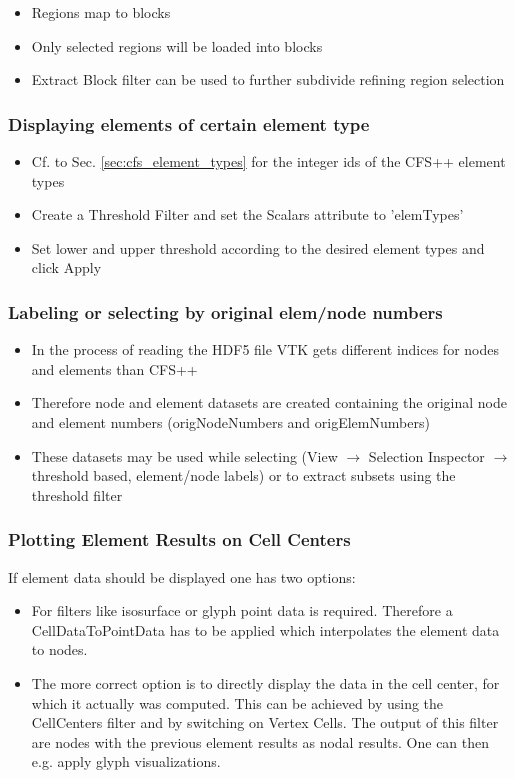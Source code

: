 \begin{itemize}
\item Regions map to blocks
\item Only selected regions will be loaded into blocks
\item Extract  Block filter can be  used to further  subdivide refining region
selection
\end{itemize}

\subsubsection{Displaying elements of certain element type}

\begin{itemize}
\item Cf. to Sec. \ref{sec:cfs_element_types} for the integer ids of the CFS++
element types
\item Create a Threshold Filter and set the Scalars attribute to 'elemTypes'
\item Set lower and upper threshold according to the desired element types and click Apply
\end{itemize}


\subsubsection{Labeling or selecting by original elem/node numbers}

\begin{itemize}
\item In the  process of reading the HDF5 file VTK  gets different indices for
nodes and elements than CFS++
\item Therefore node and element  datasets are created containing the original
node and element numbers (origNodeNumbers and origElemNumbers)
\item These datasets may be used while selecting (View $\rightarrow$ Selection
Inspector $\rightarrow$  threshold based,  element/node labels) or  to extract
subsets using the threshold filter
\end{itemize}

\subsubsection{Plotting Element Results on Cell Centers}

If element data should be displayed one has two options:

\begin{itemize}
\item For filters like isosurface or glyph point data is required. Therefore a
CellDataToPointData has to  be applied which interpolates the  element data to
nodes.

\item The  more correct  option is to  directly display  the data in  the cell
center, for which it actually was  computed. This can be achieved by using the
CellCenters filter and by switching on Vertex Cells. The output of this filter
are nodes  with the previous  element results as  nodal results. One  can then
e.g. apply glyph visualizations.
\end{itemize}

